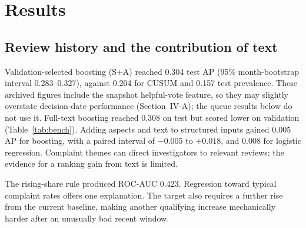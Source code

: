 \documentclass[conference]{IEEEtran}
\begin{document}
\section{Results}
\subsection{Review history and the contribution of text}
Validation-selected boosting (S+A) reached 0.304 test AP (95\% month-bootstrap interval 0.283--0.327), against 0.204 for CUSUM and 0.157 test prevalence. These archived figures include the snapshot helpful-vote feature, so they may slightly overstate decision-date performance (Section~IV-A); the queue results below do not use it. Full-text boosting reached 0.308 on test but scored lower on validation (Table~\ref{tab:bench}). Adding aspects and text to structured inputs gained 0.005 AP for boosting, with a paired interval of $-0.005$ to $+0.018$, and 0.008 for logistic regression. Complaint themes can direct investigators to relevant reviews; the evidence for a ranking gain from text is limited.

The rising-share rule produced ROC-AUC 0.423. Regression toward typical complaint rates offers one explanation. The target also requires a further rise from the current baseline, making another qualifying increase mechanically harder after an unusually bad recent window.
\end{document}
